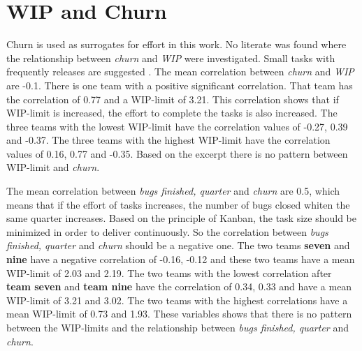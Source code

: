 \documentclass[UKenglish]{ifimaster}  %
\begin{document}
\section{WIP and Churn}
Churn is used as surrogates for effort in this work. No literate was found where the relationship between \textit{churn} and \textit{WIP} were investigated. Small tasks with frequently releases are suggested  \parencite{0984521402}. The mean correlation between \textit{churn} and \textit{WIP} are -0.1. There is one team with a positive significant correlation. That team has the correlation of 0.77 and a WIP-limit of 3.21. This correlation shows that if WIP-limit is increased, the effort to complete the tasks is also increased. The three teams with the lowest WIP-limit have the correlation values of -0.27, 0.39 and -0.37. The three teams with the highest WIP-limit have the correlation values of 0.16, 0.77 and -0.35.  Based on the excerpt there is no pattern between WIP-limit and \textit{churn}.

The mean correlation between \textit{bugs finished, quarter} and \textit{churn} are 0.5, which means that if the effort of tasks increases, the number of bugs closed whiten the same quarter increases. Based on the principle of Kanban, the task size should be minimized in order to deliver continuously. So the correlation between \textit{bugs finished, quarter} and \textit{churn} should be a negative one. The two teams \textbf{seven} and \textbf{nine} have a negative correlation of -0.16, -0.12 and these two teams have a mean WIP-limit of 2.03 and 2.19. The two teams with the lowest correlation after \textbf{team seven} and \textbf{team nine} have the correlation of 0.34, 0.33 and have a mean WIP-limit of 3.21 and 3.02. The two teams with the highest correlations have a mean WIP-limit of 0.73 and 1.93. These variables shows that there is no pattern between the WIP-limits and the relationship between \textit{bugs finished, quarter} and \textit{churn}.  




\end{document}

